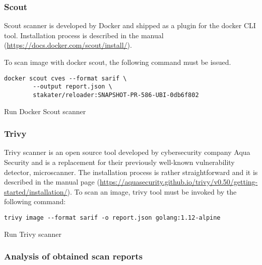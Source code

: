 \subsubsection*{Scout}

Scout scanner is developed by Docker and shipped as a plugin for the docker CLI tool. Installation process is described in the manual (\url{https://docs.docker.com/scout/install/}).

To scan image with docker scout, the following command must be issued.

\begin{listing}[htp]
    \centering
    \begin{minipage}{0.8\linewidth}
        \begin{verbatim}
docker scout cves --format sarif \ 
        --output report.json \
        stakater/reloader:SNAPSHOT-PR-586-UBI-0db6f802
        \end{verbatim}
    \end{minipage}
    \caption{Run Docker Scout scanner}
    \label{lst:scout}
\end{listing}


\subsubsection*{Trivy} 

Trivy scanner is an open source tool developed by cybersecurity company Aqua Security and is a replacement for their previously well-known vulnerability detector, microscanner. The installation process is rather straightforward and it is described in the manual page (\url{https://aquasecurity.github.io/trivy/v0.50/getting-started/installation/}). To scan an image, trivy tool must be invoked by the following command:

\begin{listing}[htp]
    \centering
    \begin{minipage}{0.8\linewidth}
        \begin{verbatim}
trivy image --format sarif -o report.json golang:1.12-alpine
        \end{verbatim}
    \end{minipage}
    \caption{Run Trivy scanner}
    \label{lst:trivy}
\end{listing}


\subsubsection{Analysis of obtained scan reports}

